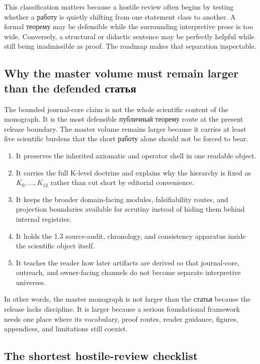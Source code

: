 This classification matters because a hostile review often begins by testing whether a работу is
quietly shifting from one statement class to another. A formal теорему may be defensible while
the surrounding interpretive prose is too wide. Conversely, a structural or didactic sentence may
be perfectly helpful while still being inadmissible as proof. The roadmap makes that separation
inspectable.

\subsection{Why the master volume must remain larger than the defended статья}

The bounded journal-core claim is not the whole scientific content of the monograph. It is the
most defensible публичный теорему route at the present release boundary. The master volume remains
larger because it carries at least five scientific burdens that the short работу alone should not
be forced to bear.

\begin{enumerate}
\item It preserves the inherited axiomatic and operator shell in one readable object.
\item It carries the full K-level doctrine and explains why the hierarchy is fixed as
      \(K_0,\dots,K_{12}\) rather than cut short by editorial convenience.
\item It keeps the broader domain-facing modules, falsifiability routes, and projection
      boundaries available for scrutiny instead of hiding them behind internal registries.
\item It holds the 1.3 source-audit, chronology, and consistency apparatus inside the scientific
      object itself.
\item It teaches the reader how later artifacts are derived so that journal-core, outreach, and
      owner-facing channels do not become separate interpretive universes.
\end{enumerate}

In other words, the master monograph is not larger than the статья because the release lacks
discipline. It is larger because a serious foundational framework needs one place where its
vocabulary, proof routes, reader guidance, figures, appendices, and limitations still coexist.

\subsection{The shortest hostile-review checklist}

